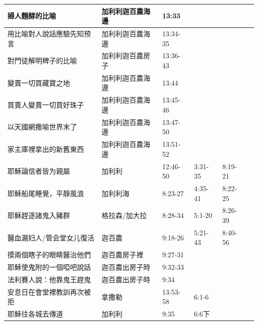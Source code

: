 \begin{table}[H]
\begin{tabular}{p{13.07em}|p{8.43em}|p{5.285em}|p{5.57em}|p{5.285em}|p{4.855em}}
婦人麵酵的比喻& 加利利迦百農海邊& \multicolumn{1}{l|}{13:33} & \multicolumn{1}{l|}{} & & \multicolumn{1}{r}{} \\ \midrule
用比喻對人說話應驗先知预言& 加利利迦百農海邊& \multicolumn{1}{l|}{13:34-35} & \multicolumn{1}{l|}{} & & \multicolumn{1}{r}{} \\ \midrule
對門徒解明稗子的比喻& 加利利迦百農房子& \multicolumn{1}{l|}{13:36-43} & \multicolumn{1}{l|}{} & & \multicolumn{1}{r}{} \\ \midrule
變賣一切買藏寶之地& 加利利迦百農海邊& \multicolumn{1}{l|}{13:44}& \multicolumn{1}{l|}{} && \multicolumn{1}{r}{} \\ \midrule
買賣人變賣一切買好珠子& 加利利迦百農海邊& \multicolumn{1}{l|}{13:45-46} & \multicolumn{1}{l|}{} &  & \multicolumn{1}{r}{} \\ \midrule

以天國網撒喻世界末了& 加利利迦百農海邊& \multicolumn{1}{l|}{13:47-50} & \multicolumn{1}{l|}{} && \multicolumn{1}{r}{} \\ \midrule
家主庫裡拿出的新舊東西& 加利利迦百農海邊& \multicolumn{1}{l|}{13:51-52} & \multicolumn{1}{l|}{} & & \multicolumn{1}{r}{} \\ \midrule

耶穌論信者皆为親屬 & 加利利   & 12:46-50 & 3:31-35 & 8:19-21 & \multicolumn{1}{r}{} \\ \midrule

耶穌船尾睡覺，平靜風浪 & 加利利海  & 8:23-27 & 4:35-41 & 8:22-25 & \multicolumn{1}{r}{} \\
    \midrule
耶穌趕逐諸鬼入豬群 & 格拉森/加大拉& 8:28-34 & 5:1-20 & 8:26-39 & \multicolumn{1}{r}{} \\
    \midrule
醫血漏妇人/管会堂女儿復活& 迦百農   & 9:18-26 & 5:21-43 & 8:40-56 & \multicolumn{1}{r}{} \\
    \midrule
摸兩個瞎子的眼睛醫治他們& 迦百農房子裡& 9:27-31 & \multicolumn{1}{r|}{} & \multicolumn{1}{r|}{} & \multicolumn{1}{r}{} \\ \midrule
耶穌使鬼附的一個啞吧說話 & 迦百農出房子時 & 9:32-33& \multicolumn{1}{r|}{} & \multicolumn{1}{r|}{} & \multicolumn{1}{r}{} \\\midrule
法利賽人說：他靠鬼王趕鬼& 迦百農出房子時 & 9:34 & \multicolumn{1}{r|}{} & \multicolumn{1}{r|}{} & \multicolumn{1}{r}{} \\\midrule
安息日在會堂裡教訓再次被拒&拿撒勒&13:53-58& \multicolumn{1}{l|}{6:1-6} & \multicolumn{1}{r|}{} & \multicolumn{1}{r}{} \\\midrule
耶穌往各城去傳道 & 加利利   & \multicolumn{1}{l|}{9:35} & 6:6下  & \multicolumn{1}{r|}{} & \multicolumn{1}{r}{} \\ \midrule


\end{tabular}
\end{table}
